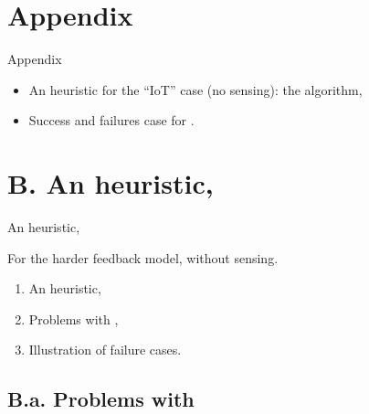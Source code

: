 \documentclass[12pt,english,ignorenonframetext,aspectratio=169,]{beamer}
\providecommand{\tightlist}{%
  \setlength{\itemsep}{0pt}\setlength{\parskip}{0pt}}
\begin{document}
\appendix{}


\section{\hfill{}Appendix\hfill{}}

\begin{frame}{Appendix}

\begin{itemize}\tightlist
\item
  An heuristic for the ``IoT'' case (no sensing): the \Selfish{} algorithm,
\item
  Success and failures case for \Selfish{}.
\end{itemize}

\end{frame}



\section{\hfill{}B. An heuristic, \Selfish\hfill{}}

\begin{frame}{An heuristic, \Selfish}

For the harder feedback model, without sensing.

\begin{enumerate}
\def\labelenumi{\arabic{enumi}.}
\tightlist
\item
  An heuristic,\vspace*{15pt}
\item
  Problems with \Selfish,\vspace*{15pt}
\item
  Illustration of failure cases.
\end{enumerate}

\end{frame}



\subsection{\hfill{}B.a. Problems with \Selfish\hfill{}}
\end{document}
